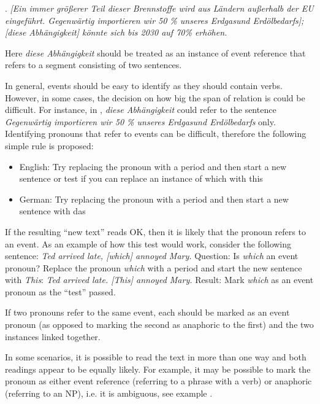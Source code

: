 \documentclass[a4paper]{article}
\begin{document}
\ex.
{\sl [Ein immer größerer Teil dieser Brennstoffe wird aus Ländern außerhalb der EU eingeführt. Gegenwärtig importieren wir 50 \% unseres Erdgasund Erdölbedarfs]; [diese Abhängigkeit] könnte sich bis 2030 auf 70\% erhöhen.}

Here {\sl diese Abhängigkeit} should be treated as an instance of event reference that refers to a segment consisting of two sentences. 


In general, events should be easy to identify as they should contain verbs. However, in some cases, the decision on how big the span of relation is could be difficult. For instance, in \Last, {\sl diese Abhängigkeit} could refer to the sentence {\sl Gegenwärtig importieren wir 50 \% unseres Erdgasund Erdölbedarfs} only. %
Identifying pronouns that refer to events can be difficult, therefore the following simple rule is proposed:

\begin{itemize}
\item English: Try replacing the pronoun with a period and then start a new
sentence or test if you can replace an instance of which with this
\item German: Try replacing the pronoun with a period and then start a new
sentence with das
\end{itemize}

If the resulting ``new text'' reads OK, then it is likely that the pronoun refers to an event. As an example of how this test would work, consider the following sentence: {\sl Ted arrived late, [which] annoyed Mary.} Question: Is {\sl which} an event pronoun? Replace the pronoun {\sl which} with a period and start the new sentence with {\sl This}:
{\sl Ted arrived late. [This] annoyed Mary.} Result: Mark {\sl which} as an event pronoun as the ``test'' passed.

If two pronouns refer to the same event, each should be marked as an event pronoun (as opposed to marking the second as anaphoric to the first) and the two instances linked together.

In some scenarios, it is possible to read the text in more than one way and both readings appear to be equally likely. For example, it may be possible to mark the pronoun as either event reference (referring to a phrase with a verb) or
anaphoric (referring to an NP), i.e. it is ambiguous, see example \Next.
\end{document}
